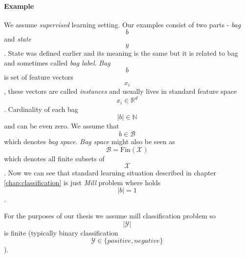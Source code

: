 \paragraph{Example}
We assume \emph{supervised} learning setting. Our examples consist of two parts - \emph{bag} $$b$$ and \emph{state} $$y$$. State was defined earlier and its meaning is the same but it is related to bag and sometimes called \emph{bag label}. \emph{Bag} $$b$$ is set of feature vectors $$x_i$$, these vectors are called \emph{instances} and usually lives in standard feature space $$x_i \in \mathbb{R}^{d}$$. Cardinality of each bag $$|b| \in \mathbb{N}$$ and can be even zero. We assume that $$b \in \mathcal{B}$$ which denotes \emph{bag space}. \emph{Bag space} might also be seen as $$\mathcal{B} = \mathrm{Fin}(\mathcal{X})$$ which denotes all finite subsets of $$\mathcal{X}$$. Now we can see that standard learning situation described in chapter \ref{chap:classification} is just \emph{Mill} problem where holds $$|b| = 1$$.

For the purposes of our thesis we assume mill classification problem so $$|\mathcal{Y}|$$ is finite (typically binary classification $$\mathcal{Y} \in \{positive, negative\}$$). 

